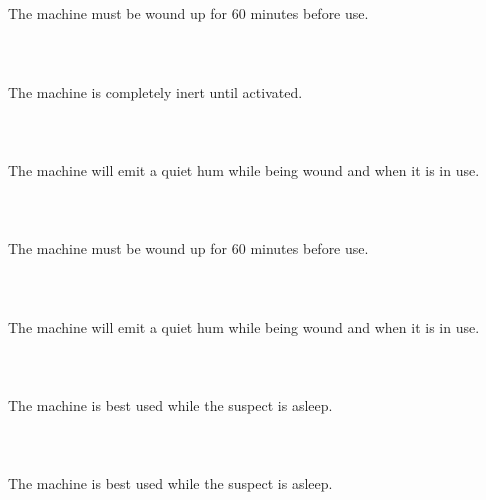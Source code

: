\documentclass{article}
\begin{document}
    \section{}
    The machine must be wound up for 60 minutes before use.\\\\ 
    \newpage
    
    \section{}
    The machine is completely inert until activated.\\\\ 
    \newpage
    
    \section{}
    The machine will emit a quiet hum while being wound and when it is in use.\\\\ 
    \newpage
    
    \section{}
    The machine must be wound up for 60 minutes before use.\\\\ 
    \newpage
    
    \section{}
    The machine will emit a quiet hum while being wound and when it is in use.\\\\ 
    \newpage
    
    \section{}
    The machine is best used while the suspect is asleep.\\\\ 
    \newpage
    
    \section{}
    The machine is best used while the suspect is asleep.\\\\ 
    \newpage
    
\end{document}
